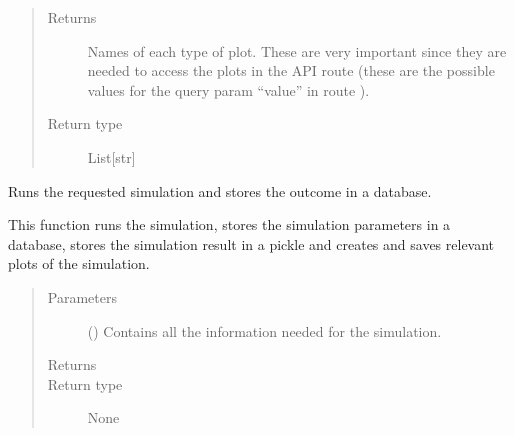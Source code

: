 \documentclass[a4paper,landscape,10pt,english]{sphinxmanual}
\begin{document}
\begin{fulllineitems}
\begin{quote}
\begin{description}
\begin{itemize}
\end{itemize}

\item[{Returns}] \leavevmode
{} \textendash{} Names of each type of plot. These are very important since they are
needed to access the plots in the API route (these are the possible
values for the query param “value” in route
).

\item[{Return type}] \leavevmode
List{[}str{]}

\end{description}\end{quote}

\end{fulllineitems}


\begin{fulllineitems}
\label{\detokenize{code_docs/simulation_api.controller:simulation_api.controller.tasks._run_simulation}}
Runs the requested simulation and stores the outcome in a database.

This function runs the simulation, stores the simulation parameters in a
database, stores the simulation result in a pickle and creates and saves
relevant plots of the simulation.
\begin{quote}\begin{description}
\item[{Parameters}] \leavevmode
{} ({\hyperref[\detokenize{code_docs/simulation_api.controller:simulation_api.controller.schemas.SimRequest}]{}}) \textendash{} Contains all the information needed for the simulation.

\item[{Returns}] \leavevmode


\item[{Return type}] \leavevmode
None

\end{description}\end{quote}

\end{fulllineitems}
\end{document}
